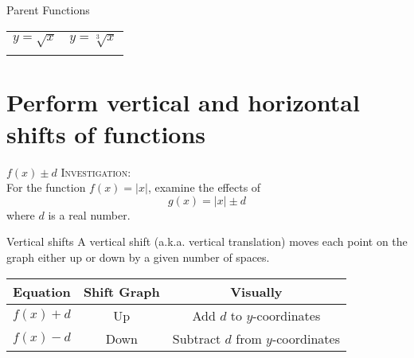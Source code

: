 \documentclass[t]{beamer}
\begin{document}
\begin{frame}{Parent Functions}
\begin{tabular}{cc}
$y = \sqrt{x}$  &   $y = \sqrt[3]{x}$   \\[11pt]
    \begin{tikzpicture}[scale=0.67]
    \begin{axis}
    [
    xmin = -5,
    xmax = 5,
    ymin = -5,
    ymax = 5,
    grid,
    axis lines = middle
    ]
    \addplot[->, >=stealth, color=blue, line width = 1.5, smooth, domain=0:4.5] {sqrt(x)};
    \end{axis}
    \end{tikzpicture} 
    &   
    \begin{tikzpicture}[scale=0.67]
    \begin{axis}
    [
    xmin = -5,
    xmax = 5,
    ymin = -5,
    ymax = 5,
    grid,
    axis lines = middle
    ]
    \addplot[<->, >=stealth, color=blue, line width = 1.5, smooth, samples = 100, domain=-4:4] {x/abs(x)*abs(x)^(1/3)};
    \end{axis}
    \end{tikzpicture}
\end{tabular}
\end{frame}



\section{Perform vertical and horizontal shifts of functions}

\begin{frame}{$f(x) \pm d$}
\textsc{Investigation:}	\newline\\

For the function $f(x) = |x|$, examine the effects of
\[g(x) = |x| \pm d \]
where $d$ is a real number.
\end{frame}

\begin{frame}{Vertical shifts}
A \alert{vertical shift} (a.k.a. \alert{vertical translation}) moves each point on the graph either up or down by a given number of spaces.	\newline\\	\pause
\begin{center}

\setlength{\extrarowheight}{6pt}
\begin{tabular}{c|c|c}
\textbf{Equation}	&	\textbf{Shift Graph} & \textbf{Visually} \\ \hline
$f(x) + d$	& Up	& Add $d$ to $y$-coordinates	\\[6pt]	\hline
$f(x) - d$ & Down & Subtract $d$ from $y$-coordinates \\
\end{tabular}
\end{center}
\end{frame}
\end{document}
